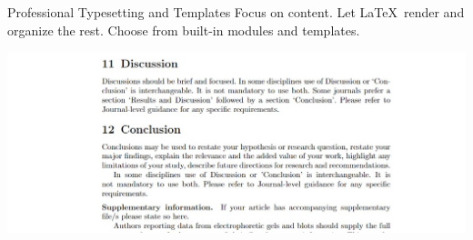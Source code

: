 \documentclass{beamer}
\begin{document}
\begin{frame}{Professional Typesetting and Templates}
    Focus on content. Let \LaTeX\ render and organize the rest. Choose from built-in modules and templates. 
    \begin{example}
    \includegraphics[width=\textwidth]{nature_paper_pic.jpg}
    
    \end{example}
\end{frame}
\end{document}
